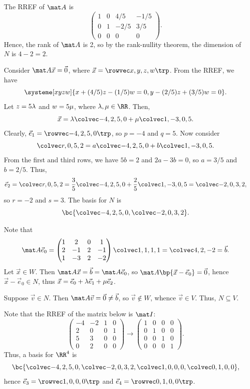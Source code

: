 \begin{solution}
    \begin{ppart}
        The RREF of $\mat A$ is \[\begin{pmatrix}1 & 0 & 4/5 & -1/5 \\ 0 & 1 & -2/5 & 3/5 \\ 0 & 0 & 0 & 0\end{pmatrix}.\] Hence, the rank of $\mat A$ is 2, so by the rank-nullity theorem, the dimension of $N$ is $4 - 2 = 2$.
    \end{ppart}
    \begin{ppart}
        Consider $\mat A \vec x = \vec 0$, where $\vec x = \cvecivx{x}{y}{z}{w}$. From the RREF, we have \[\systeme[xyzw]{x + (4/5) z - (1/5) w = 0, y - (2/5) z + (3/5) w = 0}.\] Let $z = 5\lambda$ and $w = 5\mu$, where $\l, \m \in \RR$. Then, \[\vec x = \l \cveciv{-4}250 + \m \cveciv1{-3}05.\] Clearly, $\vec e_1 = \cvecivx{-4}250$, so $p = -4$ and $q = 5$. Now consider \[\cveciv{r}052 = a \cveciv{-4}250 + b\cveciv1{-3}05.\] From the first and third rows, we have $5b = 2$ and $2a - 3b = 0$, so $a = 3/5$ and $b = 2/5$. Thus, \[\vec e_2 = \cveciv{r}052 = \frac35 \cveciv{-4}250 + \frac25 \cveciv1{-3}05 = \cveciv{-2}032,\] so $r = -2$ and $s = 3$. The basis for $N$ is \[\bc{\cveciv{-4}250, \cveciv{-2}032}.\]
    \end{ppart}
    \begin{ppart}
        Note that \[\mat A \vec e_0 = \begin{pmatrix}1 & 2 & 0 & 1 \\ 2 & -1 & 2 & -1 \\ 1 & -3 & 2 & -2\end{pmatrix} \cveciv1111 = \cveciii42{-2} = \vec b.\] Let $\vec x \in W$. Then $\mat A \vec x = \vec b = \mat A \vec e_0$, so $\mat A \bp{\vec x - \vec e_0} = \vec 0$, hence $\vec x - \vec e_0 \in N$, thus $\vec x = \vec e_0 + \lambda \vec e_1 + \mu \vec e_2$.
    \end{ppart}
    \begin{ppart}
        Suppose $\vec v \in N$. Then $\mat A \vec v = \vec 0 \neq \vec b$, so $\vec v \notin W$, whence $\vec v \in V$. Thus, $N \subseteq V$.
    \end{ppart}
    \begin{ppart}
        Note that the RREF of the matrix below is $\mat I$: \[\begin{pmatrix}-4 & -2 & 1 & 0 \\ 2 & 0 & 0 & 1 \\ 5 & 3 & 0 & 0 \\ 0 & 2 & 0 & 0\end{pmatrix} \rightarrow \begin{pmatrix}1 & 0 & 0 & 0 \\ 0 & 1 & 0 & 0 \\ 0 & 0 & 1 & 0 \\ 0 & 0 & 0 & 1\end{pmatrix}.\] Thus, a basis for $\RR^4$ is \[\bc{\cveciv{-4}250, \cveciv{-2}032, \cveciv1000, \cveciv0100},\] hence $\vec e_3 = \cvecivx1000$ and $\vec e_4 = \cvecivx0100$.
    \end{ppart}
\end{solution}

